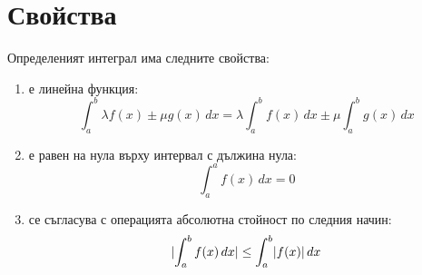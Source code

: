 \section{Свойства}

Определеният интеграл има следните свойства:
\begin{enumerate}
    \item е линейна функция:
          \[\int_a^b \lambda f(x) \pm \mu g(x) \,dx = \lambda \int_a^b f(x) \,dx \pm \mu \int_a^b g(x)\,dx\]
    \item е равен на нула върху интервал с дължина нула:
          \[\int_a^a f(x)\,dx = 0\]
    \item се съгласува с операцията абсолютна стойност по следния начин:
          \[\lvert\int_a^b f(x)\,dx\rvert \leq \int_a^b \lvert f(x)\rvert\,dx\]
\end{enumerate}

